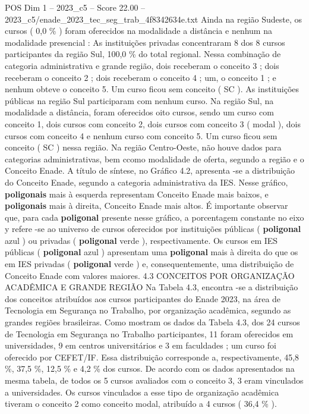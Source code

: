 \begin{textsample}{POS Dim 1 – 2023\_c5 – Score 22.00 – 2023\_c5/enade\_2023\_tec\_seg\_trab\_4f8342634e.txt}
Ainda na região Sudeste, os cursos ( 0,0 \% ) foram oferecidos na modalidade a distância e nenhum na modalidade presencial : As instituições privadas concentraram 8 dos 8 cursos participantes da região Sul, 100,0 \% do total regional.
Nessa combinação de categoria administrativa e grande região, dois receberam o conceito 3 ; dois receberam o conceito 2 ; dois receberam o conceito 4 ; um, o conceito 1 ; e nenhum obteve o conceito 5.
Um curso ficou sem conceito ( SC ).
As instituições públicas na região Sul participaram com nenhum curso.
Na região Sul, na modalidade a distância, foram oferecidos oito cursos, sendo um curso com conceito 1, dois cursos com conceito 2, dois cursos com conceito 3 ( modal ), dois cursos com conceito 4 e nenhum curso com conceito 5.
Um curso ficou sem conceito ( SC ) nessa região.
Na região Centro-Oeste, não houve dados para categorias administrativas, bem ccomo modalidade de oferta, segundo a região e o Conceito Enade.
A título de síntese, no Gráfico 4.2, apresenta -se a distribuição do Conceito Enade, segundo a categoria administrativa da IES.
Nesse gráfico, \textbf{poligonais} mais à esquerda representam Conceito Enade mais baixos, e \textbf{poligonais} mais à direita, Conceito Enade mais altos.
É importante observar que, para cada \textbf{poligonal} presente nesse gráfico, a porcentagem constante no eixo y refere -se ao universo de cursos oferecidos por instituições públicas ( \textbf{poligonal} azul ) ou privadas ( \textbf{poligonal} verde ), respectivamente.
Os cursos em IES públicas ( \textbf{poligonal} azul ) apresentam uma \textbf{poligonal} mais à direita do que os em IES privadas ( \textbf{poligonal} verde ) e, consequentemente, uma distribuição de Conceito Enade com valores maiores. 4.3 CONCEITOS POR ORGANIZAÇÃO ACADÊMICA E GRANDE REGIÃO Na Tabela 4.3, encontra -se a distribuição dos conceitos atribuídos aos cursos participantes do Enade 2023, na área de Tecnologia em Segurança no Trabalho, por organização acadêmica, segundo as grandes regiões brasileiras.
Como mostram os dados da Tabela 4.3, dos 24 cursos de Tecnologia em Segurança no Trabalho participantes, 11 foram oferecidos em universidades, 9 em centros universitários e 3 em faculdades ; um curso foi oferecido por CEFET/IF.
Essa distribuição corresponde a, respectivamente, 45,8 \%, 37,5 \%, 12,5 \% e 4,2 \% dos cursos.
De acordo com os dados apresentados na mesma tabela, de todos os 5 cursos avaliados com o conceito 3, 3 eram vinculados a universidades.
Os cursos vinculados a esse tipo de organização acadêmica tiveram o conceito 2 como conceito modal, atribuído a 4 cursos ( 36,4 \% ).

\end{textsample}
